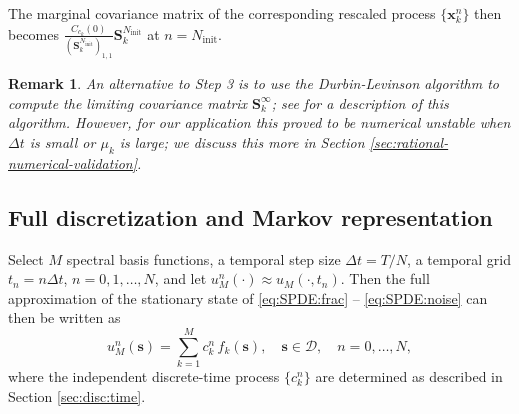\documentclass[12pt]{article} %
\newcommand{\cb}{\color{blue}}
\newtheorem{remark}{Remark}
\begin{document}
The marginal covariance matrix of the corresponding rescaled process $\{\boldsymbol{x}_k^{n}\}$ then becomes $
\frac{C_{c_k}(0)}{(\mathbf{S}_{k}^{N_\mathrm{\mathrm{init}}})_{1,1}}
\mathbf{S}_{k}^{N_{\mathrm{init}}}$ at $n=N_{\mathrm{init}}$.
%

\begin{remark}
An alternative to Step 3 is to use the Durbin-Levinson algorithm to compute the limiting covariance matrix $\mathbf{S}_{k}^{\infty}$; see \cite[Chapter 2.5.3]{Brockwell2016} for a description of this algorithm. However, for our application this proved to be numerical unstable when $\Delta t$ is small or $\mu_k$ is large; we discuss this more in Section \ref{sec:rational-numerical-validation}. \smallskip

\end{remark}

\subsection{Full discretization and Markov representation}\label{sec:DiscFull}
Select $M$ spectral basis functions, a temporal step size $\Delta t=T/N$, a temporal grid $t_n = n \Delta t$, $n = 0, 1, \ldots, N$, and let $u_M^n(\cdot) \approx u_M(\cdot, t_n)$. Then the full approximation of the stationary state of \eqref{eq:SPDE:frac} -- \eqref{eq:SPDE:noise} can then be written as
\begin{equation} \label{eq:full-discretisation}
    u^n_M(\boldsymbol{s}) = \sum_{k = 1}^M c_k^n \,f_k(\boldsymbol{s}), \quad \boldsymbol{s}\in\mathcal{D}, \quad n = 0,\ldots, N,
\end{equation}
where the independent discrete-time process $\{c_k^n\}$ are determined as described
in Section \ref{sec:disc:time}.
\end{document}
